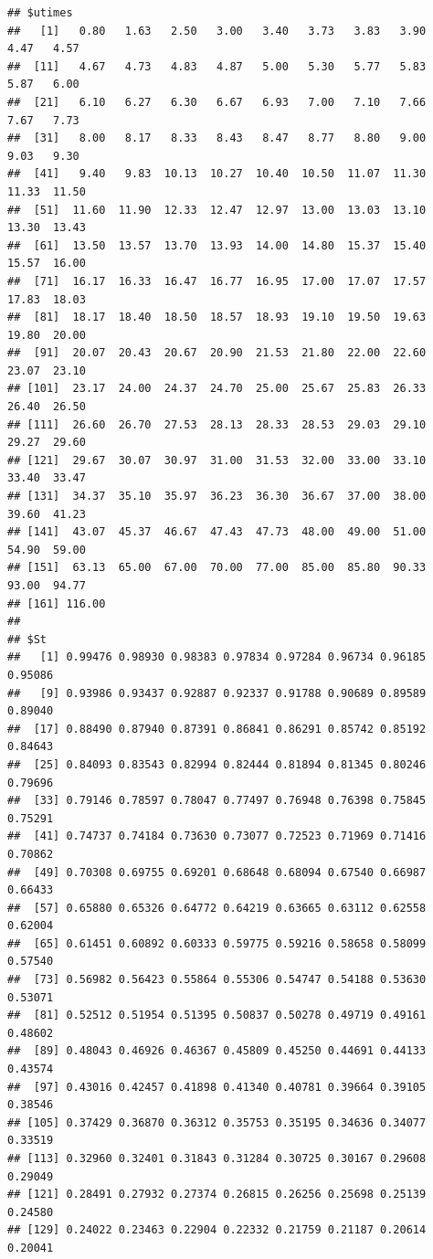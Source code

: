 \documentclass{article}\usepackage[]{graphicx}\usepackage[]{color}
\makeatletter
\newenvironment{kframe}{%
 \def\at@end@of@kframe{}%
 \ifinner\ifhmode%
  \def\at@end@of@kframe{\end{minipage}}%
  \begin{minipage}{\columnwidth}%
 \fi\fi%
 \def\FrameCommand##1{\hskip\@totalleftmargin \hskip-\fboxsep
 \colorbox{shadecolor}{##1}\hskip-\fboxsep
     \hskip-\linewidth \hskip-\@totalleftmargin \hskip\columnwidth}%
 \MakeFramed {\advance\hsize-\width
   \@totalleftmargin\z@ \linewidth\hsize
   \@setminipage}}%
 {\par\unskip\endMakeFramed%
 \at@end@of@kframe}
\newenvironment{knitrout}{}{} %
\makeatother
\begin{document}
\begin{knitrout}
\begin{kframe}\begin{verbatim}
## $utimes
##   [1]   0.80   1.63   2.50   3.00   3.40   3.73   3.83   3.90   4.47   4.57
##  [11]   4.67   4.73   4.83   4.87   5.00   5.30   5.77   5.83   5.87   6.00
##  [21]   6.10   6.27   6.30   6.67   6.93   7.00   7.10   7.66   7.67   7.73
##  [31]   8.00   8.17   8.33   8.43   8.47   8.77   8.80   9.00   9.03   9.30
##  [41]   9.40   9.83  10.13  10.27  10.40  10.50  11.07  11.30  11.33  11.50
##  [51]  11.60  11.90  12.33  12.47  12.97  13.00  13.03  13.10  13.30  13.43
##  [61]  13.50  13.57  13.70  13.93  14.00  14.80  15.37  15.40  15.57  16.00
##  [71]  16.17  16.33  16.47  16.77  16.95  17.00  17.07  17.57  17.83  18.03
##  [81]  18.17  18.40  18.50  18.57  18.93  19.10  19.50  19.63  19.80  20.00
##  [91]  20.07  20.43  20.67  20.90  21.53  21.80  22.00  22.60  23.07  23.10
## [101]  23.17  24.00  24.37  24.70  25.00  25.67  25.83  26.33  26.40  26.50
## [111]  26.60  26.70  27.53  28.13  28.33  28.53  29.03  29.10  29.27  29.60
## [121]  29.67  30.07  30.97  31.00  31.53  32.00  33.00  33.10  33.40  33.47
## [131]  34.37  35.10  35.97  36.23  36.30  36.67  37.00  38.00  39.60  41.23
## [141]  43.07  45.37  46.67  47.43  47.73  48.00  49.00  51.00  54.90  59.00
## [151]  63.13  65.00  67.00  70.00  77.00  85.00  85.80  90.33  93.00  94.77
## [161] 116.00
## 
## $St
##   [1] 0.99476 0.98930 0.98383 0.97834 0.97284 0.96734 0.96185 0.95086
##   [9] 0.93986 0.93437 0.92887 0.92337 0.91788 0.90689 0.89589 0.89040
##  [17] 0.88490 0.87940 0.87391 0.86841 0.86291 0.85742 0.85192 0.84643
##  [25] 0.84093 0.83543 0.82994 0.82444 0.81894 0.81345 0.80246 0.79696
##  [33] 0.79146 0.78597 0.78047 0.77497 0.76948 0.76398 0.75845 0.75291
##  [41] 0.74737 0.74184 0.73630 0.73077 0.72523 0.71969 0.71416 0.70862
##  [49] 0.70308 0.69755 0.69201 0.68648 0.68094 0.67540 0.66987 0.66433
##  [57] 0.65880 0.65326 0.64772 0.64219 0.63665 0.63112 0.62558 0.62004
##  [65] 0.61451 0.60892 0.60333 0.59775 0.59216 0.58658 0.58099 0.57540
##  [73] 0.56982 0.56423 0.55864 0.55306 0.54747 0.54188 0.53630 0.53071
##  [81] 0.52512 0.51954 0.51395 0.50837 0.50278 0.49719 0.49161 0.48602
##  [89] 0.48043 0.46926 0.46367 0.45809 0.45250 0.44691 0.44133 0.43574
##  [97] 0.43016 0.42457 0.41898 0.41340 0.40781 0.39664 0.39105 0.38546
## [105] 0.37429 0.36870 0.36312 0.35753 0.35195 0.34636 0.34077 0.33519
## [113] 0.32960 0.32401 0.31843 0.31284 0.30725 0.30167 0.29608 0.29049
## [121] 0.28491 0.27932 0.27374 0.26815 0.26256 0.25698 0.25139 0.24580
## [129] 0.24022 0.23463 0.22904 0.22332 0.21759 0.21187 0.20614 0.20041

\end{verbatim}
\end{kframe}
\end{knitrout}
\end{document}
